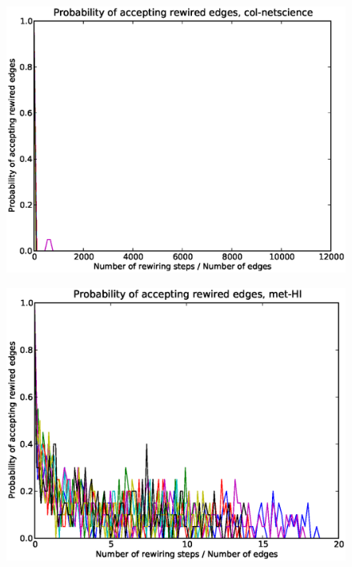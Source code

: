 \documentclass[12pt]{article}
\begin{document}
\begin{figure}[p]
\includegraphics[scale=0.75]{Paccept-col-netscience.eps}\\
\end{figure}


\begin{figure}[p]
\includegraphics[scale=0.75]{Paccept-met-HI.eps}\\
\end{figure}
\end{document}
